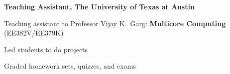 

\begin{myexp}
\item \textbf{Teaching Assistant, The University of Texas at 
    Austin}  
    \begin{mybullet}
        \item Teaching assistant to Professor Vijay K.~Garg: {\bf Multicore
            Computing} (EE382V/EE379K) 
        \item Led students to do projects
        \item Graded homework sets, quizzes, and exams
    \end{mybullet}


\end{myexp}
